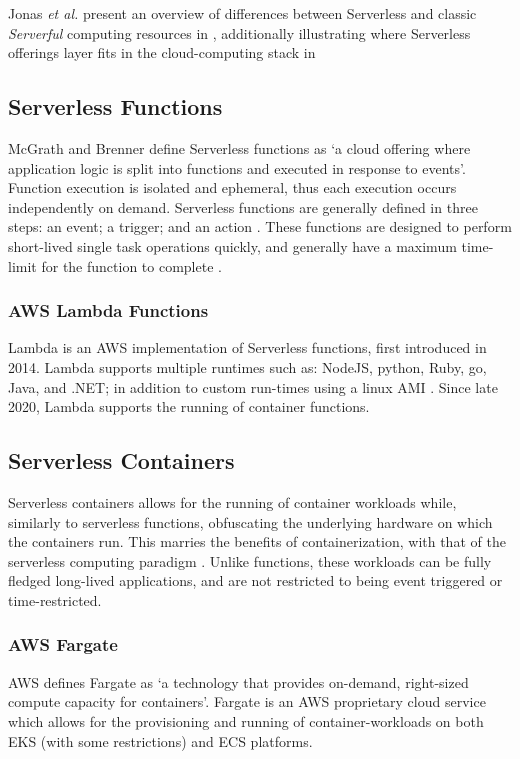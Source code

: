 Jonas \emph{et al.} present an overview of differences between Serverless and classic \emph{Serverful} computing resources in \cite[Table 2]{jonas2019cloud}, 
additionally illustrating where Serverless offerings layer fits in the cloud-computing stack in \cite[Figure 1]{jonas2019cloud}

\subsection{Serverless Functions}
McGrath and Brenner define Serverless functions as `a cloud offering where application logic is split into functions and
executed in response to events'\cite{mcgrath2017serverless}. 
Function execution is isolated and ephemeral, thus each execution occurs independently on demand.
Serverless functions are generally defined in three steps: an event; a trigger; and an action \cite{baldini2016cloud}. 
These functions are designed to perform short-lived single task operations quickly, and generally have a maximum time-limit for the function to complete \cite{hellerstein2018serverlessdisadvantages}.


\subsubsection{AWS Lambda Functions}
Lambda\cite{musgrave_2022} is an AWS implementation of Serverless functions, first introduced in 2014\cite{handy_2014}.
Lambda supports multiple runtimes such as: NodeJS, python, Ruby, go, Java, and .NET; in addition to custom run-times using a linux AMI \cite{musgrave_2022_runtimes}.
Since late 2020, Lambda supports the running of container functions\cite{lambda}.

\subsection{Serverless Containers}
Serverless containers allows for the running of container workloads while, similarly to serverless functions, obfuscating the underlying hardware on which the containers run. 
This marries the benefits of containerization, with that of the serverless computing paradigm \cite{PEREZ201850}. 
Unlike functions, these workloads can be fully fledged long-lived applications, and are not restricted to being event triggered or time-restricted.

\subsubsection{AWS Fargate}
AWS defines Fargate as `a technology that provides on-demand, right-sized compute capacity for containers'\cite{hansen_2022_fargate}. 
Fargate is an AWS proprietary cloud service which allows for the provisioning and running of container-workloads on both EKS (with some restrictions) and ECS platforms. 

